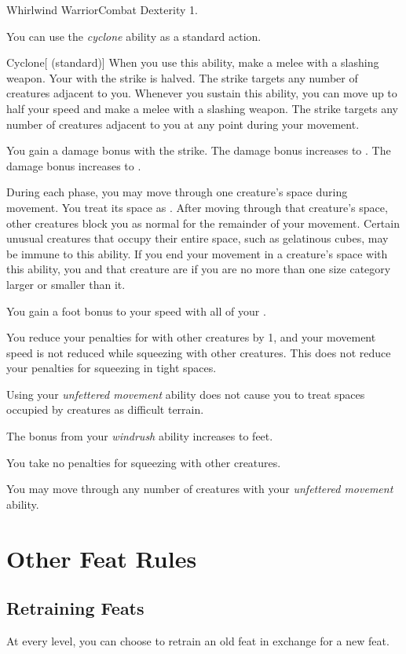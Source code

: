     \begin{feat}{Whirlwind Warrior}{Combat}
        \featpre Dexterity 1.

         You can use the \textit{cyclone} ability as a standard action.
        \begin{freeability}{Cyclone}[ (standard)]
            When you use this ability, make a melee  with a slashing weapon.
            Your  with the strike is halved.
            The strike targets any number of creatures adjacent to you.
            Whenever you sustain this ability, you can move up to half your speed and make a melee  with a slashing weapon.
            The strike targets any number of creatures adjacent to you at any point during your movement.

            \rankline
             You gain a  damage bonus with the strike.
             The damage bonus increases to .
             The damage bonus increases to .
        \end{freeability}

         During each phase, you may move through one creature's space during movement.
        You treat its space as .
        After moving through that creature's space, other creatures block you as normal for the remainder of your movement.
        Certain unusual creatures that occupy their entire space, such as gelatinous cubes, may be immune to this ability.
        If you end your movement in a creature's space with this ability, you and that creature are \squeezing if you are no more than one size category larger or smaller than it.

         You gain a  foot bonus to your speed with all of your .

         You reduce your penalties for \squeezing with other creatures by 1, and your movement speed is not reduced while squeezing with other creatures.
        This does not reduce your penalties for squeezing in tight spaces.

         Using your \textit{unfettered movement} ability does not cause you to treat spaces occupied by creatures as difficult terrain.

         The bonus from your \textit{windrush} ability increases to  feet.

         You take no penalties for squeezing with other creatures.

         You may move through any number of creatures with your \textit{unfettered movement} ability.
    \end{feat}

\section{Other Feat Rules}

    \subsection{Retraining Feats}
        At every level, you can choose to retrain an old feat in exchange for a new feat.
